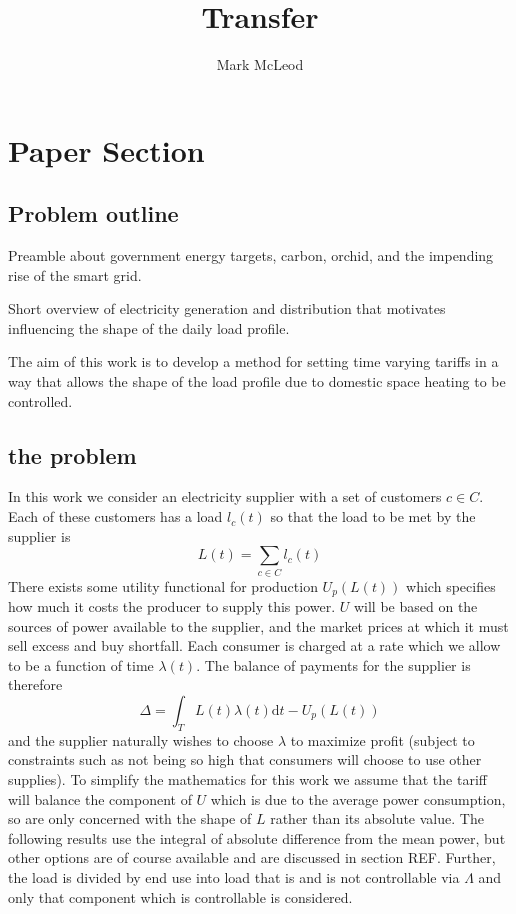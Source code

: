 \documentclass[a4paper, 10 pt, conference]{ieeeconf}  %
\title{\LARGE \bf Transfer}
\author{Mark McLeod}
\date{}
\begin{document}
\maketitle
\thispagestyle{empty}
\pagestyle{empty}

\section{Paper Section}
\subsection{Problem outline}
Preamble about government energy targets, carbon, orchid, and the impending rise of the smart grid.

Short overview of electricity generation and distribution that motivates influencing the shape of the daily load profile.

The aim of this work is to develop a method for setting time varying tariffs in a way that allows the shape of the load profile due to domestic space heating to be controlled.
\subsection{the problem}
In this work we consider an electricity supplier with a set of customers $c \in C$. Each of these customers has a load $l_{c}(t)$  so that the load to be met by the supplier is
\begin{equation}
L(t) = \sum_{c \in C} l_{c}(t)
\end{equation}
There exists some utility functional for production $U_{p}(L(t))$ which specifies how much it costs the producer to supply this power. $U$ will be based on the sources of power available to the supplier, and the market prices at which it must sell excess and buy shortfall.
Each consumer is charged at a rate which we allow to be a function of time $\lambda (t)$. The balance of payments for the supplier is therefore
\begin{equation}
\Delta = \int_{T}L(t) \lambda(t) \mathrm{d}t - U_{p}(L(t))
\end{equation}
and the supplier naturally wishes to choose $\lambda$ to maximize profit (subject to constraints such as not being so high that consumers will choose to use other supplies). To simplify the mathematics for this work we assume that the tariff will balance the component of $U$ which is due to the average power consumption, so are only concerned with the shape of $L$ rather than its absolute value. The following results use the integral of absolute difference from the mean power, but other options are of course available and are discussed in section REF.
Further, the load is divided by end use into load that is and is not controllable via $\Lambda$ and only that component which is controllable is considered.
\end{document}
